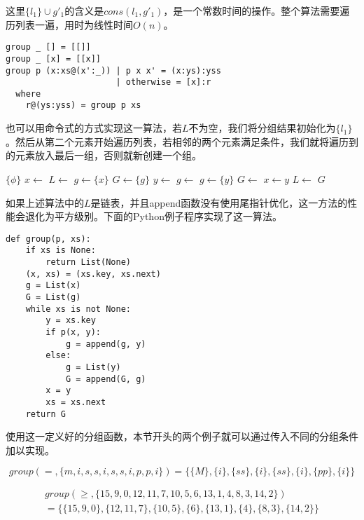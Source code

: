\documentclass[UTF8]{article}
\begin{document}
这里$\{l_1\} \cup g'_1$的含义是$cons(l_1, g'_1)$，是一个常数时间的操作。整个算法需要遍历列表一遍，用时为线性时间$O(n)$。

\lstset{language=Haskell}
\begin{lstlisting}[style=Haskell]
group _ [] = [[]]
group _ [x] = [[x]]
group p (x:xs@(x':_)) | p x x' = (x:ys):yss
                      | otherwise = [x]:r
  where
    r@(ys:yss) = group p xs
\end{lstlisting}

也可以用命令式的方式实现这一算法，若$L$不为空，我们将分组结果初始化为$\{{l_1\}}$。然后从第二个元素开始遍历列表，若相邻的两个元素满足条件，我们就将遍历到的元素放入最后一组，否则就新创建一个组。

\begin{algorithmic}[1]
    \State \Return $\{ \phi \}$
  \EndIf
  \State $x \gets$ 
  \State $L \gets$ 
  \State $g \gets \{ x \}$
  \State $G \gets \{ g \}$
    \State $y \gets$ 
      \State $g \gets $ 
    \Else
      \State $g \gets \{y\}$
      \State $G \gets$ 
    \EndIf
    \State $x \gets y$
    \State $L \gets$ 
  \EndWhile
  \State \Return $G$
\EndFunction
\end{algorithmic}

如果上述算法中的$L$是链表，并且append函数没有使用尾指针优化，这一方法的性能会退化为平方级别。下面的Python例子程序实现了这一算法。

\lstset{language=Python}
\begin{lstlisting}
def group(p, xs):
    if xs is None:
        return List(None)
    (x, xs) = (xs.key, xs.next)
    g = List(x)
    G = List(g)
    while xs is not None:
        y = xs.key
        if p(x, y):
            g = append(g, y)
        else:
            g = List(y)
            G = append(G, g)
        x = y
        xs = xs.next
    return G
\end{lstlisting}

使用这一定义好的分组函数，本节开头的两个例子就可以通过传入不同的分组条件加以实现。

\[
group(=, \{m,i,s,s,i,s,s,i,p,p,i\}) = \{ \{M\}, \{i\}, \{ss\}, \{i\}, \{ss\}, \{i\}, \{pp\}, \{i\} \}
\]

\[
\begin{array}{l}
group(\geq,  \{15, 9, 0, 12, 11, 7, 10, 5, 6, 13, 1, 4, 8, 3, 14, 2\}) \\
  = \{ \{15, 9, 0\}, \{12, 11, 7\}, \{10, 5\}, \{6\}, \{13, 1\}, \{4\}, \{8, 3\}, \{14, 2\}\}
\end{array}
\]
\end{document}
